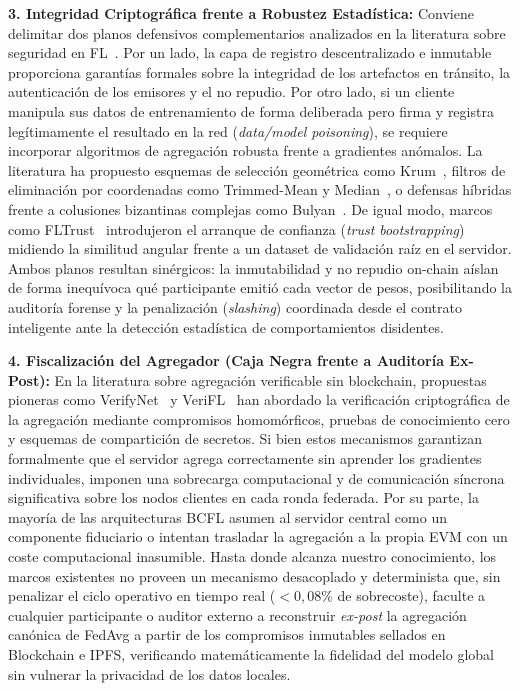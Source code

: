 \textbf{3. Integridad Criptográfica frente a Robustez Estadística:} Conviene delimitar dos planos defensivos complementarios analizados en la literatura sobre seguridad en FL~\cite{bouacida2021vulnerabilities, jere2021taxonomy}. Por un lado, la capa de registro descentralizado e inmutable proporciona garantías formales sobre la integridad de los artefactos en tránsito, la autenticación de los emisores y el no repudio. Por otro lado, si un cliente manipula sus datos de entrenamiento de forma deliberada pero firma y registra legítimamente el resultado en la red (\textit{data/model poisoning}), se requiere incorporar algoritmos de agregación robusta frente a gradientes anómalos. La literatura ha propuesto esquemas de selección geométrica como Krum~\cite{blanchard2017byzantine}, filtros de eliminación por coordenadas como Trimmed-Mean y Median~\cite{yin2018byzantine}, o defensas híbridas frente a colusiones bizantinas complejas como Bulyan~\cite{mhamdi2018hidden}. De igual modo, marcos como FLTrust~\cite{cao2021fltrust} introdujeron el arranque de confianza (\textit{trust bootstrapping}) midiendo la similitud angular frente a un dataset de validación raíz en el servidor. Ambos planos resultan sinérgicos: la inmutabilidad y no repudio on-chain aíslan de forma inequívoca qué participante emitió cada vector de pesos, posibilitando la auditoría forense y la penalización (\textit{slashing}) coordinada desde el contrato inteligente ante la detección estadística de comportamientos disidentes.

\textbf{4. Fiscalización del Agregador (Caja Negra frente a Auditoría Ex-Post):} En la literatura sobre agregación verificable sin blockchain, propuestas pioneras como VerifyNet~\cite{xu2020verifynet} y VeriFL~\cite{guo2021verifl} han abordado la verificación criptográfica de la agregación mediante compromisos homomórficos, pruebas de conocimiento cero y esquemas de compartición de secretos. Si bien estos mecanismos garantizan formalmente que el servidor agrega correctamente sin aprender los gradientes individuales, imponen una sobrecarga computacional y de comunicación síncrona significativa sobre los nodos clientes en cada ronda federada. Por su parte, la mayoría de las arquitecturas BCFL asumen al servidor central como un componente fiduciario o intentan trasladar la agregación a la propia EVM con un coste computacional inasumible. Hasta donde alcanza nuestro conocimiento, los marcos existentes no proveen un mecanismo desacoplado y determinista que, sin penalizar el ciclo operativo en tiempo real ($<0{,}08\%$ de sobrecoste), faculte a cualquier participante o auditor externo a reconstruir \textit{ex-post} la agregación canónica de FedAvg a partir de los compromisos inmutables sellados en Blockchain e IPFS, verificando matemáticamente la fidelidad del modelo global sin vulnerar la privacidad de los datos locales.

